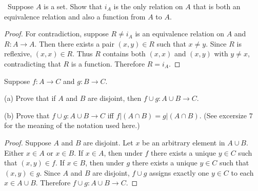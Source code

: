 \newpage
\begin{tcolorbox}[title=Problem 11, breakable]\
    Suppose $A$ is a set. 
    Show that $i_A$ is the only relation on $A$ that 
        is both an equivalence relation and also a function from $A$ to $A$.
\end{tcolorbox}

\begin{proof}
    For contradiction, suppose $R \ne i_A$ is an equivalence relation on $A$
        and $R : A \rightarrow A$.
    Then there exists a pair $(x, y) \in R$ such that $x \ne y$.
    Since $R$ is reflexive, $(x, x) \in R$.
    Thus $R$ contains both $(x, x)$ and $(x, y)$ with $y \ne x$,
        contradicting that $R$ is a function.
    Therefore $R = i_A$.
\end{proof}

\begin{tcolorbox}[title=Problem 12, breakable]
    Suppose $f : A \rightarrow C$ and $g : B \rightarrow C$.

    (a) Prove that if $A$ and $B$ are disjoint, then $f \cup g : A \cup B \rightarrow C$.

    (b) Prove that $f \cup g : A \cup B \rightarrow C$ iff $f | (A \cap B) = g | (A \cap B)$.
        (See excersize $7$ for the meaning of the notation used here.)
\end{tcolorbox}

\begin{proof}
    Suppose $A$ and $B$ are disjoint.
    Let $x$ be an arbitrary element in $A \cup B$.
    Either $x \in A$ or $x \in B$.
    If $x \in A$, then under $f$ there exists a unique $y \in C$
        such that $(x, y) \in f$.
    If $x \in B$, then under $g$ there exists a unique $y \in C$
        such that $(x, y) \in g$.
    Since $A$ and $B$ are disjoint, $f \cup g$ assigns exactly one $y \in C$
        to each $x \in A \cup B$.
    Therefore $f \cup g : A \cup B \rightarrow C$.
\end{proof}

